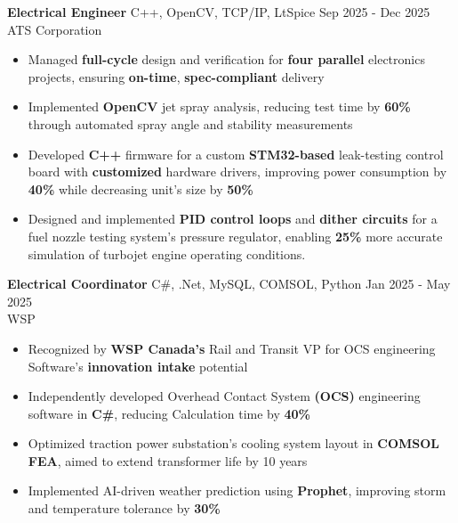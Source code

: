 \documentclass[10pt]{article}
\newcommand{\SSsep}{-2.0em}
\begin{document}
\noindent\textbf{Electrical Engineer} \hspace{\WEVBsep}\textbar\hspace{\WEVBsep} C++, OpenCV, TCP/IP, LtSpice \hfill Sep 2025 - Dec 2025 \\[\TtCsep]
ATS Corporation \\[\CtPsep]
\begin{itemize}
    \item Managed \textbf{full-cycle} design and verification for \textbf{four parallel} electronics projects, ensuring \textbf{on-time}, \textbf{spec-compliant} delivery \\[\PtPsep]
    \item Implemented \textbf{OpenCV} jet spray analysis, reducing test time by \textbf{60\%} through automated spray angle and stability measurements\\[\PtPsep]
    \item Developed \textbf{C++} firmware for a custom \textbf{STM32-based} leak-testing control board with \textbf{customized}  hardware drivers, improving power consumption by \textbf{40\%} while decreasing unit’s size by \textbf{50\%} \\[\PtPsep]
    \item Designed and implemented \textbf{PID control loops} and \textbf{dither circuits} for a fuel nozzle testing system’s pressure regulator, \hspace{4em} enabling \textbf{25\%} more accurate simulation of turbojet engine operating conditions. \\[\WStWSsep]
\end{itemize}

\noindent\textbf{Electrical Coordinator} \hspace{\WEVBsep}\textbar\hspace{\WEVBsep} C\#, .Net, MySQL, COMSOL, Python \hfill Jan 2025 - May 2025 \\[\TtCsep]
WSP \\[\CtPsep]
\begin{itemize}
    \item Recognized by \textbf{\small WSP Canada’s} Rail and Transit VP for OCS engineering Software’s \textbf{innovation intake} potential \\[\PtPsep]
    \item Independently developed Overhead Contact System \textbf{\small (OCS)} engineering software in\textbf{ C\#}, reducing Calculation time by \textbf{40\%} \\[\PtPsep]
    \item Optimized traction power substation’s cooling system layout in \textbf{\small COMSOL FEA}, aimed to extend transformer life by 10 years \\[\PtPsep]
    \item Implemented AI-driven weather prediction using \textbf{Prophet}, improving storm and temperature tolerance by \textbf{30\%} \\[\SSsep]
\end{itemize}
\end{document}

